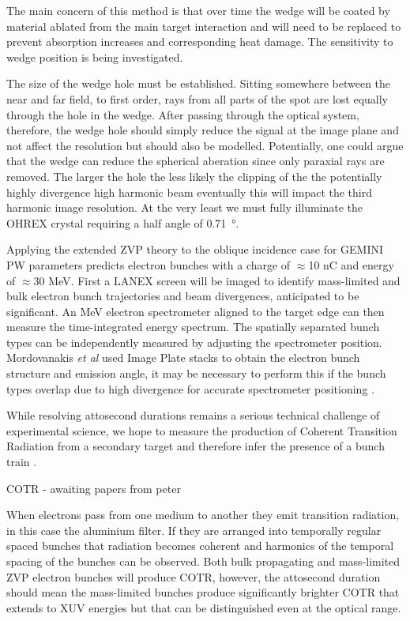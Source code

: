 The main concern of this method is that over time the wedge will be coated by material ablated from the main target interaction and will need to be replaced to prevent absorption increases and corresponding heat damage. The sensitivity to wedge position is being investigated.

The size of the wedge hole must be established. Sitting somewhere between the near and far field, to first order, rays from all parts of the spot are lost equally through the hole in the wedge. After passing through the optical system, therefore, the wedge hole should simply reduce the signal at the image plane and not affect the resolution but should also be modelled. Potentially, one could argue that the wedge can reduce the spherical aberation since only paraxial rays are removed. The larger the hole the less likely the clipping of the the potentially highly divergence high harmonic beam eventually this will impact the third harmonic image resolution. At the very least we must fully illuminate the OHREX crystal requiring a half angle of \qty{0.71}{\degree}.

Applying the extended ZVP theory to the oblique incidence case for GEMINI PW parameters predicts electron bunches with a charge of $\approx$10 nC and energy of $\approx$30 MeV.
First a LANEX screen will be imaged to identify mass-limited and bulk electron bunch trajectories and beam divergences, anticipated to be significant. An MeV electron spectrometer aligned to the target edge can then measure the time-integrated energy spectrum. The spatially separated bunch types can be independently measured by adjusting the spectrometer position. Mordovanakis \textit{et al} used Image Plate stacks to obtain the electron bunch structure and emission angle, it may be necessary to perform this if the bunch types overlap due to high divergence for accurate spectrometer positioning \cite{mordovanakisQuasimonoenergeticElectronBeams2009}. 

While resolving attosecond durations remains a serious technical challenge of experimental science, we hope to measure the production of Coherent Transition Radiation from a secondary target and therefore infer the presence of a bunch train \cite{linIsolatedAttosecondElectron2020}. 
 

 COTR - awaiting papers from peter
 
 When electrons pass from one medium to another they emit transition radiation, in this case the aluminium filter. If they are arranged into temporally regular spaced bunches that radiation becomes coherent and harmonics of the temporal spacing of the bunches can be observed. Both bulk propagating and mass-limited ZVP electron bunches will produce COTR, however, the attosecond duration should mean the mass-limited bunches produce significantly brighter COTR that extends to XUV energies but that can be distinguished even at the optical range.

